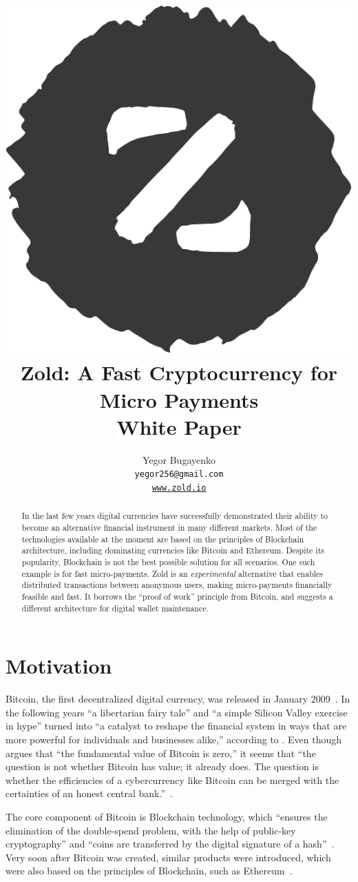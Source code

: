 \documentclass{main}
\title{\includegraphics[scale=0.3]{../images/logo.pdf}\\
  Zold: A Fast Cryptocurrency for Micro Payments\\
  {\small\colorbox{white}{White Paper}}}
\author{Yegor Bugayenko\\
  \texttt{yegor256@gmail.com}\\
  \href{https://www.zold.io}{\texttt{www.zold.io}}\\[1em]
  \href{https://github.com/zold-io/papers/releases/tag/\zoldversion}{\texttt{\zoldversion}}}
\begin{document}
\maketitle
\begin{abstract}
In the last few years digital currencies have successfully demonstrated
their ability to become an alternative financial instrument in many
different markets. Most of the technologies available at the moment are
based on the principles of Blockchain architecture, including
dominating currencies like Bitcoin and Ethereum. Despite its
popularity, Blockchain is not the best possible solution for all scenarios.
One such example is for fast micro-payments.
Zold is an \emph{experimental} alternative that enables distributed transactions between
anonymous users, making micro-payments financially feasible and fast.
It borrows the ``proof of work'' principle from Bitcoin,
and suggests a different architecture for digital wallet maintenance.
\end{abstract}

\section{Motivation}

Bitcoin, the first decentralized digital currency, was released in January 2009~\parencite{nakamoto2008}.
In the following years ``a libertarian fairy tale'' and ``a simple Silicon Valley exercise in hype''
turned into ``a catalyst to reshape the financial system in ways that are more
powerful for individuals and businesses alike,'' according to \textcite{andreessen2014}.
Even though \textcite{cheah2015} argues that
``the fundamental value of Bitcoin is zero,''
it seems that ``the question is not whether Bitcoin has value; it already does.
The question is whether the efficiencies of a cybercurrency
like Bitcoin can be merged with the certainties of an honest central bank.''~\parencite{van2014}.

The core component of Bitcoin is Blockchain technology, which
``ensures the elimination of the double-spend problem, with the help
of public-key cryptography'' and ``coins are transferred by the
digital signature of a hash''~\parencite{pilkington2016}.
Very soon after Bitcoin was created, similar products were introduced,
which were also based on the principles of Blockchain, such as
Ethereum~\parencite{buterin2013}.
\end{document}
